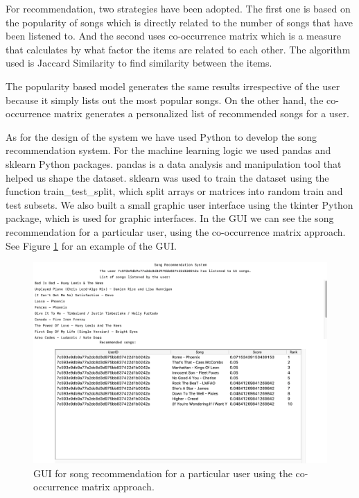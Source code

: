 \documentclass{jot}
\begin{document}
For recommendation, two strategies have been adopted. The first one is based on the popularity of songs which is directly related to the number of songs that have been listened to. And the second uses co-occurrence matrix which is a measure that calculates by what factor the items are related to each other. The algorithm used is Jaccard Similarity to find similarity between the items.

The popularity based model generates the same results irrespective of the user because it simply lists out the most popular songs. On the other hand, the co-occurrence matrix generates a personalized list of recommended songs for a user.

As for the design of the system we have used Python to develop the song recommendation system. For the machine learning logic we used pandas and sklearn Python packages. pandas is a data analysis and manipulation tool that helped us shape the dataset. sklearn was used to train the dataset using the function train\_test\_split, which split arrays or matrices into random train and test subsets. We also built a small graphic user interface using the tkinter Python package, which is used for graphic interfaces. In the GUI we can see the song recommendation for a particular user, using the co-occurrence matrix approach. See Figure \ref{fig:design} for an example of the GUI.

\begin{figure}[h!]
    \centering%
    \includegraphics[width=\textwidth]{design}
    \caption{GUI for song recommendation for a particular user using the co-occurrence matrix approach.}
    \label{fig:design}
\end{figure}%
\end{document}
